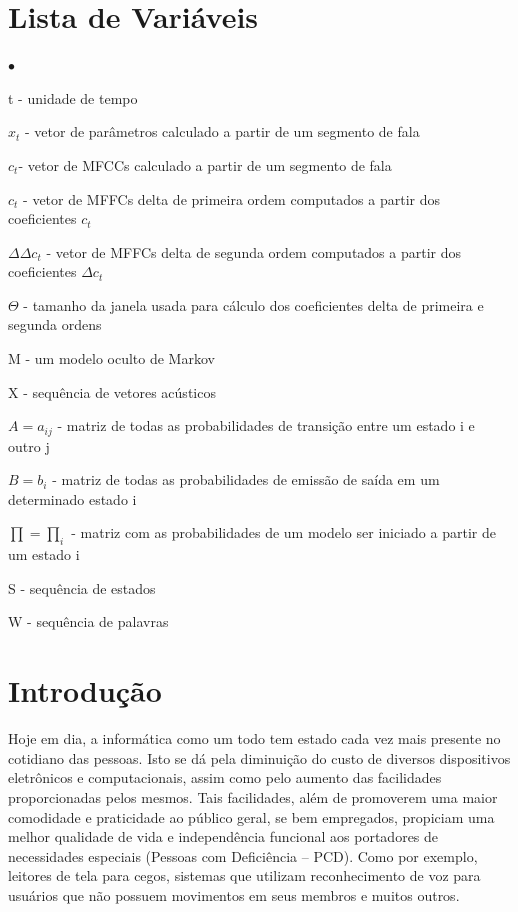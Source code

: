 \documentclass[12pt,a4paper,oneside]{report}
\begin{document}
\chapter*{Lista de Variáveis}
\begin{list}{$\bullet$}{}
\item[] t - unidade de tempo
\item[] $x_{t}$ - vetor de parâmetros calculado a partir de um segmento de fala
\item[] $c_{t}$- vetor de MFCCs calculado a partir de um segmento de fala
\item[] $c_{t}$ - vetor de MFFCs delta de primeira ordem computados a partir dos coeficientes $c_{t}$
\item[] $\Delta\Delta c_{t}$ - vetor de MFFCs delta de segunda ordem computados a partir dos coeficientes $\Delta c_{t}$
\item[] $\Theta$ - tamanho da janela usada para cálculo dos coeficientes delta de primeira e segunda ordens
\item[] M - um modelo oculto de Markov
\item[] X - sequência de vetores acústicos
\item[] $A = a_{ij}$ - matriz de todas as probabilidades de transição entre um estado i e outro j
\item[] $B = b_{i}$ - matriz de todas as probabilidades de emissão de saída em um determinado estado i
\item[] $\prod = \prod_{i}$ - matriz com as probabilidades de um modelo ser iniciado a partir de um estado i
\item[] S - sequência de estados
\item[] W - sequência de palavras
\end{list}

\tableofcontents

\listoffigures

\listoftables


\chapter{Introdução}

Hoje em dia, a informática como um todo tem estado cada vez mais presente no cotidiano das pessoas. Isto se dá pela diminuição do custo de diversos dispositivos eletrônicos e computacionais, assim como pelo aumento das facilidades proporcionadas pelos mesmos. Tais facilidades, além de promoverem uma maior comodidade e praticidade ao público geral, se bem empregados, propiciam uma melhor qualidade de vida e independência funcional aos portadores de necessidades especiais (Pessoas com Deficiência – PCD). Como por exemplo, leitores de tela para cegos, sistemas que utilizam reconhecimento de voz para usuários que não possuem movimentos em seus membros e muitos outros.
\end{document}
